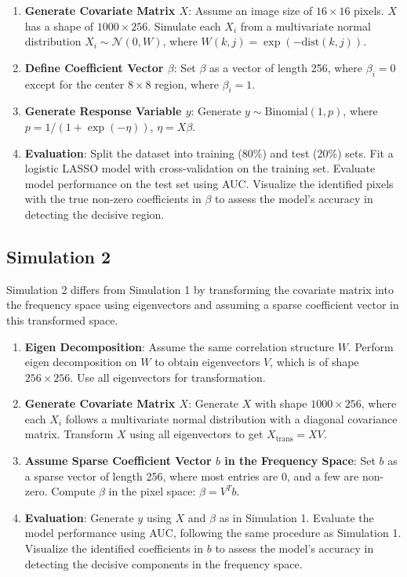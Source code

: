 \documentclass[12pt]{article}
\begin{document}
\begin{enumerate}
	\item \textbf{Generate Covariate Matrix \( X \)}: Assume an image size of \(16 \times 16\) pixels. \( X \) has a shape of \(1000 \times 256\). Simulate each \( X_i \) from a multivariate normal distribution \( X_i \sim \mathcal{N}(0, W) \), where \( W(k, j) = \exp(-\text{dist}(k, j)) \).

	\item \textbf{Define Coefficient Vector \( \beta \)}: Set \(\beta\) as a vector of length 256, where \(\beta_i = 0\) except for the center \(8 \times 8\) region, where \(\beta_i = 1\).

	\item \textbf{Generate Response Variable \( y \)}: Generate \( y \sim \text{Binomial}(1, p) \), where \( p = 1 /  (1 + \exp(-\eta)) \), \( \eta = X \beta \).

	\item \textbf{Evaluation}: Split the dataset into training (80\%) and test (20\%) sets. Fit a logistic LASSO model with cross-validation on the training set. Evaluate model performance on the test set using AUC. Visualize the identified pixels with the true non-zero coefficients in \(\beta\) to assess the model's accuracy in detecting the decisive region.
\end{enumerate}

\subsection*{Simulation 2}

Simulation 2 differs from Simulation 1 by transforming the covariate matrix into the frequency space using eigenvectors and assuming a sparse coefficient vector in this transformed space.

\begin{enumerate}
	\item \textbf{Eigen Decomposition}: Assume the same correlation structure \( W \). Perform eigen decomposition on \( W \) to obtain eigenvectors \( V \), which is of shape \( 256 \times 256 \). Use all eigenvectors for transformation.

	\item \textbf{Generate Covariate Matrix \( X \)}: Generate \( X \) with shape \( 1000 \times 256 \), where each \( X_i \) follows a multivariate normal distribution with a diagonal covariance matrix. Transform \( X \) using all eigenvectors to get \( X_{\text{trans}} = X V \).

	\item \textbf{Assume Sparse Coefficient Vector \( b \) in the Frequency Space}: Set \( b \) as a sparse vector of length 256, where most entries are 0, and a few are non-zero. Compute \( \beta \) in the pixel space: \( \beta = V^T b \).

	\item \textbf{Evaluation}: Generate \( y \) using \( X \) and \( \beta \) as in Simulation 1. Evaluate the model performance using AUC, following the same procedure as Simulation 1. Visualize the identified coefficients in \( b \) to assess the model's accuracy in detecting the decisive components in the frequency space.
\end{enumerate}
\end{document}
